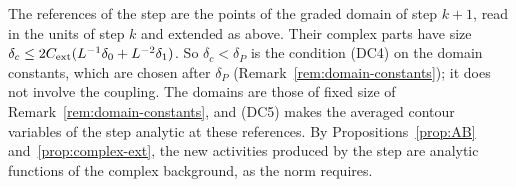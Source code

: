 \begin{remark}\label{rem:complex-ext-use}
The references of the step are the points of the graded domain of step $k+1$, read in the units of step $k$ and extended as above. Their complex parts have size $\delta_c\le2C_{\rm ext}(L^{-1}\delta_0+L^{-2}\delta_1)$. So $\delta_c<\delta_P$ is the condition (DC4) on the domain constants, which are chosen after $\delta_P$ (Remark~\ref{rem:domain-constants}); it does not involve the coupling. The domains are those of fixed size of Remark~\ref{rem:domain-constants}, and (DC5) makes the averaged contour variables of the step analytic at these references. By Propositions~\ref{prop:AB} and~\ref{prop:complex-ext}, the new activities produced by the step are analytic functions of the complex background, as the norm requires.
\end{remark}

